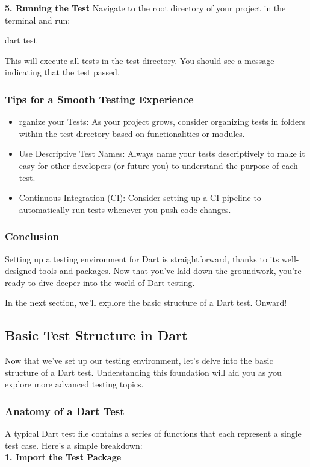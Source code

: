 \noindent\large{\textbf{5. Running the Test}}
Navigate to the root directory of your project in the terminal and run:

\begin{bashcode}
    dart test
\end{bashcode}
This will execute all tests in the test directory. You should see a message indicating that the test passed.

\subsubsection*{Tips for a Smooth Testing Experience}
\begin{itemize}
    \item rganize your Tests: As your project grows, consider organizing tests in folders within the test directory based on functionalities or modules.
    \item Use Descriptive Test Names: Always name your tests descriptively to make it easy for other developers (or future you) to understand the purpose of each test.
    \item Continuous Integration (CI): Consider setting up a CI pipeline to automatically run tests whenever you push code changes.
\end{itemize}

\subsubsection*{Conclusion}
Setting up a testing environment for Dart is straightforward, thanks to its well-designed tools and packages. 
Now that you've laid down the groundwork, you're ready to dive deeper into the world of Dart testing.

In the next section, we'll explore the basic structure of a Dart test. Onward!

\subsection{Basic Test Structure in Dart}
Now that we've set up our testing environment, let's delve into the basic structure of a Dart test. 
Understanding this foundation will aid you as you explore more advanced testing topics.

\subsubsection*{Anatomy of a Dart Test}
A typical Dart test file contains a series of  functions that each represent a single test case. Here's a simple breakdown:\\[1em]
\noindent\large{\textbf{1. Import the Test Package}}\\

